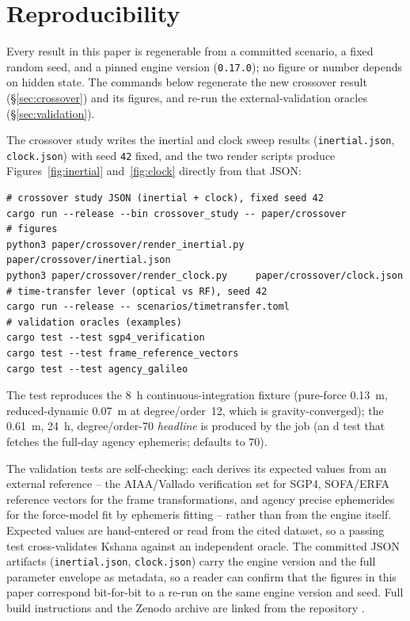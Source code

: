 \section{Reproducibility}\label{app:repro}

Every result in this paper is regenerable from a committed scenario, a fixed
random seed, and a pinned engine version (\texttt{0.17.0}); no figure or number
depends on hidden state. The commands below regenerate the new crossover result
(\S\ref{sec:crossover}) and its figures, and re-run the external-validation
oracles (\S\ref{sec:validation}).

The crossover study writes the inertial and clock sweep results
(\texttt{inertial.json}, \texttt{clock.json}) with seed \texttt{42} fixed, and
the two render scripts produce Figures~\ref{fig:inertial} and~\ref{fig:clock}
directly from that JSON:

\begin{verbatim}
# crossover study JSON (inertial + clock), fixed seed 42
cargo run --release --bin crossover_study -- paper/crossover
# figures
python3 paper/crossover/render_inertial.py paper/crossover/inertial.json
python3 paper/crossover/render_clock.py     paper/crossover/clock.json
# time-transfer lever (optical vs RF), seed 42
cargo run --release -- scenarios/timetransfer.toml
# validation oracles (examples)
cargo test --test sgp4_verification
cargo test --test frame_reference_vectors
cargo test --test agency_galileo
\end{verbatim}

The  test reproduces the \SI{8}{\hour} continuous-integration
fixture (pure-force \SI{0.13}{\metre}, reduced-dynamic \SI{0.07}{\metre} at
degree/order~12, which is gravity-converged); the \SI{0.61}{\metre}, \SI{24}{\hour},
degree/order-70 \emph{headline} is produced by the 
job (an \code{\#[ignore]}d test that fetches the full-day agency ephemeris;
 defaults to 70).

The validation tests are self-checking: each derives its expected values from an
external reference -- the AIAA/Vallado verification set for SGP4, SOFA/ERFA
reference vectors for the frame transformations, and agency precise ephemerides
for the force-model fit by ephemeris fitting -- rather than from the engine
itself. Expected values are hand-entered or read from the cited dataset, so a
passing test cross-validates Kshana against an independent oracle. The committed
JSON artifacts (\texttt{inertial.json}, \texttt{clock.json}) carry the engine
version and the full parameter envelope as metadata, so a reader can confirm that
the figures in this paper correspond bit-for-bit to a re-run on the same engine
version and seed. Full build instructions and the Zenodo archive are linked from
the repository \citep{baweja2026kshana}.
